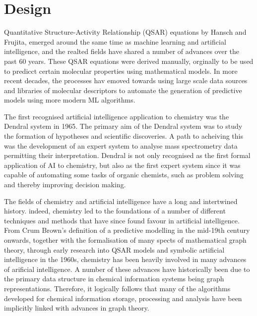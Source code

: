 \section*{Design}


Quantitative Structure-Activity Relationship (QSAR) equations by Hansch and Frujita, emerged around the same time as machine learning and artificial intelligence, and the realted fields have shared a number of advances over the past 60 years. These QSAR equations were derived manually, orginally to be used to predicct certain molecular properties using mathematical models. In more recent decades, the processes hav emoved towards using large scale data sources and libraries of molecular descriptors to automate the generation of predictive models using more modern ML algorithms. 

The first recognised artificial intelligence application to chemistry was the Dendral system in 1965. The primary aim of the Dendral system was to study the formation of hypotheses and scientific discoveries. A path to acheiving this was the development of an expert system to analyse mass spectrometry data permitting their interpretation. Dendral is not only recognised as the first formal application of AI to chemistry, but also as the first expert system since it was capable of automating some tasks of organic chemists, such as problem solving and thereby improving decision making. 

The fields of chemistry and artificial intelligence have a long and intertwined history. indeed, chemistry led to the foundations of a number of different techniques and methods that have since found favour in artificial intelligence. From Crum Brown's definition of a predictive modelling in the mid-19th century onwards, together with the formalisation of many spects of mathematical graph theory, through early research into QSAR models and symbolic artificial intelligence in the 1960s, chemistry has been heavily involved in many advances of arificial intelligence. A number of these advances have historically been due to the primary data structure in chemical information systems being graph representations. Therefore, it logically follows that many of the algorithms developed for chemical information storage, processing and analysis have been implicitly linked with advances in graph theory.


